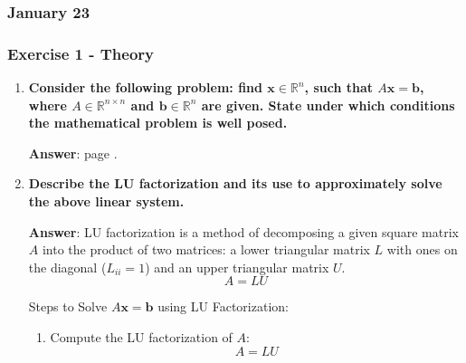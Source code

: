 \subsubsection{January 23}

\subsubsection*{Exercise 1 - Theory}

\begin{enumerate}[label=\textcolor{Green3}{\textbf{\arabic*.}}]
    \item \textcolor{Green3}{\textbf{%
        Consider the following problem: find $\mathbf{x} \in \mathbb{R}^{n}$, such that $A\mathbf{x} = \mathbf{b}$, where $A \in \mathbb{R}^{n \times n}$ and $\mathbf{b} \in \mathbb{R}^{n}$ are given. State under which conditions the mathematical problem is well posed.
    }}

    \textbf{Answer}: page .




    \item \textcolor{Green3}{\textbf{%
        Describe the LU factorization and its use to approximately solve the above linear system.
    }}

    \textbf{Answer}: LU factorization is a method of decomposing a given square matrix $A$ into the product of two matrices: a lower triangular matrix $L$ with ones on the diagonal ($L_{ii} = 1$) and an upper triangular matrix $U$.
    \begin{equation*}
        A = LU
    \end{equation*}
    
    Steps to Solve $A\mathbf{x} = \mathbf{b}$ using LU Factorization:
    \begin{enumerate}
        \item Compute the LU factorization of $A$:
        \begin{equation*}
            A = LU
        \end{equation*}


\end{enumerate}
\end{enumerate}
